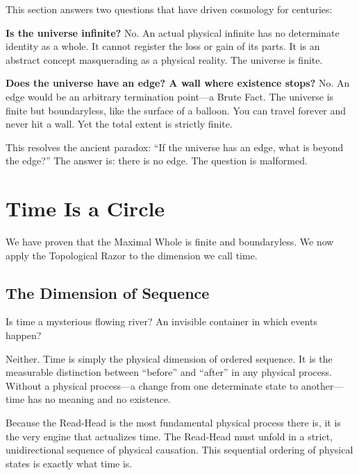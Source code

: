 \documentclass[11pt]{article}
\theoremstyle{canonstyle}
\begin{document}
\begin{realization}
This section answers two questions that have driven cosmology for centuries:

\medskip

\textbf{Is the universe infinite?}
No. An actual physical infinite has no determinate identity as a whole. It cannot register the loss or gain of its parts. It is an abstract concept masquerading as a physical reality. The universe is finite.

\textbf{Does the universe have an edge? A wall where existence stops?}
No. An edge would be an arbitrary termination point---a Brute Fact. The universe is finite but boundaryless, like the surface of a balloon. You can travel forever and never hit a wall. Yet the total extent is strictly finite.

\medskip

This resolves the ancient paradox: ``If the universe has an edge, what is beyond the edge?'' The answer is: there is no edge. The question is malformed.
\end{realization}

\newpage

\section{Time Is a Circle}

We have proven that the Maximal Whole is finite and boundaryless. We now apply the Topological Razor to the dimension we call time. 

\subsection{The Dimension of Sequence}

\begin{reflect}
Is time a mysterious flowing river? An invisible container in which events happen?
\end{reflect}

Neither. Time is simply the physical dimension of ordered sequence. It is the measurable distinction between ``before'' and ``after'' in any physical process. Without a physical process---a change from one determinate state to another---time has no meaning and no existence. 

Because the Read-Head is the most fundamental physical process there is, it is the very engine that actualizes time. The Read-Head must unfold in a strict, unidirectional sequence of physical causation. This sequential ordering of physical states is exactly what time is.
\end{document}

